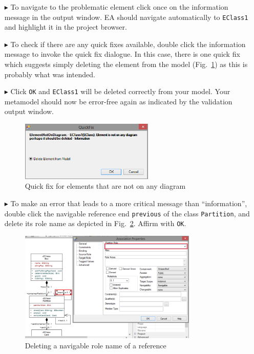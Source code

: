 \begin{enumerate}
\item[$\blacktriangleright$] To navigate to the problematic element click once on the information message in the output window.
EA should navigate automatically to \texttt{EClass1} and highlight it in the project browser.
\item[$\blacktriangleright$] To check if there are any quick fixes available, double click the information message to invoke the quick fix dialogue.
In this case, there is one quick fix which suggests simply deleting the element from the model (Fig.~\ref{fig:quick-fix1}) as this is probably what was intended.
\item[$\blacktriangleright$] Click \texttt{OK} and \texttt{EClass1} will be deleted correctly from your model.
Your metamodel should now be error-free again as indicated by the validation output window.

\begin{figure}[htbp]
	\centering
  \includegraphics[width=0.6\textwidth]{pics/memBoxBilder/memBox45}
	\caption{Quick fix for elements that are not on any diagram}
	\label{fig:quick-fix1}
\end{figure}

\item[$\blacktriangleright$] To make an error that leads to a more critical message than ``information'',
double click the navigable reference end \texttt{previous} of the class \texttt{Partition}, and delete its role name as depicted in Fig.~\ref{fig:delete-role-name}.
Affirm with \texttt{OK}.

\begin{figure}[htbp]
	\centering
  \includegraphics[width=0.8\textwidth]{pics/memBoxBilder/memBox46}
	\caption{Deleting a navigable role name of a reference}
	\label{fig:delete-role-name}
\end{figure}


\end{enumerate}
